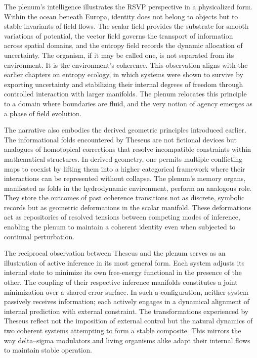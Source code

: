 The plenum's intelligence illustrates the RSVP perspective in a physicalized form. Within the ocean beneath Europa, identity does not belong to objects but to stable invariants of field flows. The scalar field provides the substrate for smooth variations of potential, the vector field governs the transport of information across spatial domains, and the entropy field records the dynamic allocation of uncertainty. The organism, if it may be called one, is not separated from its environment. It is the environment’s coherence. This observation aligns with the earlier chapters on entropy ecology, in which systems were shown to survive by exporting uncertainty and stabilizing their internal degrees of freedom through controlled interaction with larger manifolds. The plenum relocates this principle to a domain where boundaries are fluid, and the very notion of agency emerges as a phase of field evolution.

The narrative also embodies the derived geometric principles introduced earlier. The informational folds encountered by Theseus are not fictional devices but analogues of homotopical corrections that resolve incompatible constraints within mathematical structures. In derived geometry, one permits multiple conflicting maps to coexist by lifting them into a higher categorical framework where their interactions can be represented without collapse. The plenum’s memory organs, manifested as folds in the hydrodynamic environment, perform an analogous role. They store the outcomes of past coherence transitions not as discrete, symbolic records but as geometric deformations in the scalar manifold. These deformations act as repositories of resolved tensions between competing modes of inference, enabling the plenum to maintain a coherent identity even when subjected to continual perturbation.

The reciprocal observation between Theseus and the plenum serves as an illustration of active inference in its most general form. Each system adjusts its internal state to minimize its own free-energy functional in the presence of the other. The coupling of their respective inference manifolds constitutes a joint minimization over a shared error surface. In such a configuration, neither system passively receives information; each actively engages in a dynamical alignment of internal prediction with external constraint. The transformations experienced by Theseus reflect not the imposition of external control but the natural dynamics of two coherent systems attempting to form a stable composite. This mirrors the way delta–sigma modulators and living organisms alike adapt their internal flows to maintain stable operation.

